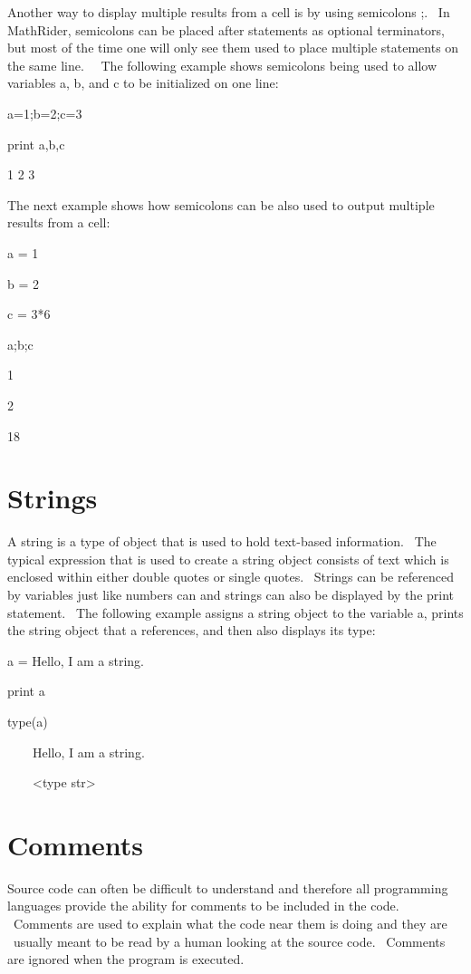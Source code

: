 \documentclass[12pt,twoside]{book}
\begin{document}
\bigskip

Another way to display multiple results from a cell is by using
semicolons {\textquotesingle};{\textquotesingle}. \ In MathRider,
semicolons can be placed after statements as optional terminators, but
most of the time one will only see them used to place multiple
statements on the same line. \ \ The following example shows semicolons
being used to allow variables a, b, and c to be initialized on one
line:


\bigskip

a=1;b=2;c=3

print a,b,c

{\textbar}

1 2 3

The next example shows how semicolons can be also used to output
multiple results from a cell:


\bigskip

a = 1

b = 2

c = 3*6

a;b;c

{\textbar}

1

2

18

\section[Strings]{Strings}
A string is a type of object that is used to hold text{}-based
information. \ The typical expression that is used to create a string
object consists of text which is enclosed within either double quotes
or single quotes. \ Strings can be referenced by variables just like
numbers can and strings can also be displayed by the print statement.
\ The following example assigns a string object to the variable
{\textquotesingle}a{\textquotesingle}, prints the string object that
{\textquotesingle}a{\textquotesingle} references, and then also
displays its type:


\bigskip

a = {\textquotedbl}Hello, I am a string.{\textquotedbl}

print a

type(a)

{\textbar}

\ \ \ \ Hello, I am a string.

\ \ \ \ {\textless}type
{\textquotesingle}str{\textquotesingle}{\textgreater}

\section[Comments]{Comments}
Source code can often be difficult to understand and therefore all
programming languages provide the ability for comments to be included
in the code. \ Comments are used to explain what the code near them is
doing and they are \ usually meant to be read by a human looking at the
source code. \ Comments are ignored when the program is executed.
\end{document}
